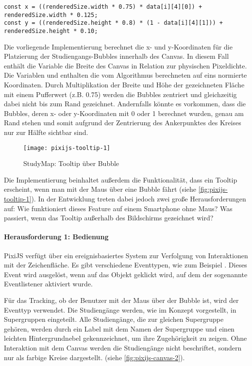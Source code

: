 \begin{lstlisting}[style=Python]
const x = ((renderedSize.width * 0.75) * data[i][4][0]) + renderedSize.width * 0.125;
const y = ((renderedSize.height * 0.8) * (1 - data[i][4][1])) + renderedSize.height * 0.10;
\end{lstlisting}

Die vorliegende Implementierung berechnet die x- und y-Koordinaten für die Platzierung der Studiengangs-Bubbles innerhalb des Canvas. In diesem Fall enthält die Variable  die Breite des Canvas in Relation zur physischen Pixeldichte. Die Variablen  und  enthalten die vom Algorithmus berechneten auf eins normierte Koordinaten. Durch Multiplikation der Breite und Höhe der gezeichneten Fläche mit einem Pufferwert (z.B. 0.75) werden die Bubbles zentriert und gleichzeitig dabei nicht bis zum Rand gezeichnet. Andernfalls könnte es vorkommen, dass die Bubbles, deren x- oder y-Koordinaten mit 0 oder 1 berechnet wurden, genau am Rand stehen und somit aufgrund der Zentrierung des Ankerpunktes des Kreises nur zur Hälfte sichtbar sind.

\begin{figure}[H]
    \centering
    \texttt{[image: pixijs-tooltip-1]}
    \caption{StudyMap: Tooltip über Bubble}
    \label{fig:pixijs-tooltip-1}
\end{figure}

Die Implementierung beinhaltet außerdem die Funktionalität, dass ein Tooltip erscheint, wenn man mit der Maus über eine Bubble fährt (siehe \autoref{fig:pixijs-tooltip-1}). In der Entwicklung treten dabei jedoch zwei große Herausforderungen auf: Wie funktioniert dieses Feature auf einem Smartphone ohne Maus? Was passiert, wenn das Tooltip außerhalb des Bildschirms gezeichnet wird?

\paragraph*{Herausforderung 1: Bedienung}
PixiJS verfügt über ein ereignisbasiertes System zur Verfolgung von Interaktionen mit der Zeichenfläche. Es gibt verschiedene Eventtypen, wie zum Beispiel . Dieses Event wird ausgelöst, wenn auf das Objekt geklickt wird, auf dem der sogenannte Eventlistener aktiviert wurde. \parencite{pixijs_interaction_2024}

Für das Tracking, ob der Benutzer mit der Maus über der Bubble ist, wird der Eventtyp  verwendet. Die Studiengänge werden, wie im Konzept vorgestellt, in Supergruppen eingeteilt. Alle Studiengänge, die zur gleichen Supergruppe gehören, werden durch ein Label mit dem Namen der Supergruppe und einen leichten Hintergrundnebel gekennzeichnet, um ihre Zugehörigkeit zu zeigen. Ohne Interaktion mit dem Canvas werden die Studiengänge nicht beschriftet, sondern nur als farbige Kreise dargestellt. (siehe \autoref{fig:pixijs-canvas-2}).

